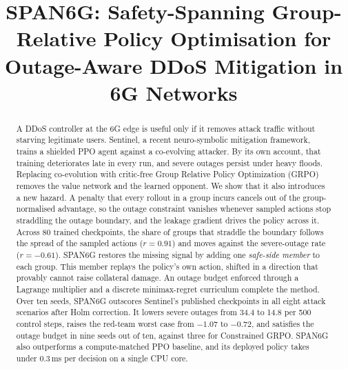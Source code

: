 \documentclass[conference]{IEEEtran}
\begin{document}
\title{SPAN6G: Safety-Spanning Group-Relative Policy Optimisation for Outage-Aware DDoS Mitigation in 6G Networks}

\author{
}

\maketitle

\begin{abstract}
A DDoS controller at the 6G edge is useful only if it removes attack traffic without starving legitimate users. Sentinel, a recent neuro-symbolic mitigation framework, trains a shielded PPO agent against a co-evolving attacker. By its own account, that training deteriorates late in every run, and severe outages persist under heavy floods. Replacing co-evolution with critic-free Group Relative Policy Optimization (GRPO) removes the value network and the learned opponent. We show that it also introduces a new hazard. A penalty that every rollout in a group incurs cancels out of the group-normalised advantage, so the outage constraint vanishes whenever sampled actions stop straddling the outage boundary, and the leakage gradient drives the policy across it. Across 80 trained checkpoints, the share of groups that straddle the boundary follows the spread of the sampled actions ($r=0.91$) and moves against the severe-outage rate ($r=-0.61$). SPAN6G restores the missing signal by adding one \emph{safe-side member} to each group. This member replays the policy's own action, shifted in a direction that provably cannot raise collateral damage. An outage budget enforced through a Lagrange multiplier and a discrete minimax-regret curriculum complete the method. Over ten seeds, SPAN6G outscores Sentinel's published checkpoints in all eight attack scenarios after Holm correction. It lowers severe outages from 34.4 to 14.8 per 500 control steps, raises the red-team worst case from $-1.07$ to $-0.72$, and satisfies the outage budget in nine seeds out of ten, against three for Constrained GRPO. SPAN6G also outperforms a compute-matched PPO baseline, and its deployed policy takes under 0.3\,ms per decision on a single CPU core.
\end{abstract}
\end{document}
